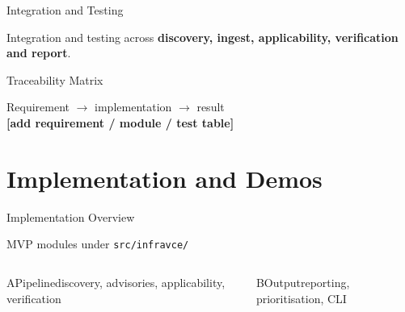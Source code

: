 \documentclass[aspectratio=169,12pt]{beamer}
\newlength{\ch}\setlength{\ch}{47mm}
\newcommand{\ph}[1]{\textcolor{accent}{\textbf{[#1]}}}
\begin{document}
\begin{frame}{Integration and Testing}
\begin{stmt}Integration and testing across \textbf{discovery, ingest, applicability, verification and report}.\end{stmt}
\end{frame}

\begin{frame}{Traceability Matrix}
\begin{stmt}Requirement $\rightarrow$ implementation $\rightarrow$ result\\[3mm]\fontsize{13}{16}\selectfont\ph{add requirement / module / test table}\end{stmt}
\end{frame}

\section{Implementation and Demos}
\begin{frame}{Implementation Overview}
\begin{stmt}[height={14mm},height plus=30mm,fontupper=\Large]MVP modules under \texttt{src/infravce/}\end{stmt}\vskip2.5mm\setlength{\ch}{31mm}
\begin{columns}[T,onlytextwidth]
\begin{tc}{A}{Pipeline}\normalsize discovery, advisories, applicability, verification\end{tc}
\begin{tcteal}{B}{Output}\normalsize reporting, prioritisation, CLI\end{tcteal}
\end{columns}
\end{frame}
\end{document}
